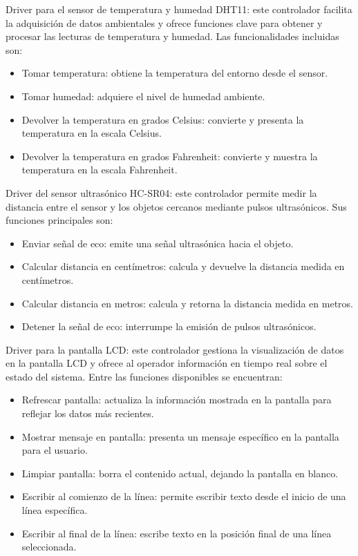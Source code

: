 Driver para el sensor de temperatura y humedad DHT11: este controlador facilita la adquisición de datos ambientales y ofrece funciones clave para obtener y procesar las lecturas de temperatura y humedad. Las funcionalidades incluidas son:
\begin{itemize}
\item Tomar temperatura: obtiene la temperatura del entorno desde el sensor.
\item Tomar humedad: adquiere el nivel de humedad ambiente.
\item Devolver la temperatura en grados Celsius: convierte y presenta la temperatura en la escala Celsius.
\item Devolver la temperatura en grados Fahrenheit: convierte y muestra la temperatura en la escala Fahrenheit.
\end{itemize}

Driver del sensor ultrasónico HC-SR04: este controlador permite medir la distancia entre el sensor y los objetos cercanos mediante pulsos ultrasónicos. Sus funciones principales son:
\begin{itemize}
\item Enviar señal de eco: emite una señal ultrasónica hacia el objeto.
\item Calcular distancia en centímetros: calcula y devuelve la distancia medida en centímetros.
\item Calcular distancia en metros: calcula y retorna la distancia medida en metros.
\item Detener la señal de eco: interrumpe la emisión de pulsos ultrasónicos.
\end{itemize}

Driver para la pantalla LCD: este controlador gestiona la visualización de datos en la pantalla LCD y ofrece al operador información en tiempo real sobre el estado del sistema. Entre las funciones disponibles se encuentran:
\begin{itemize}
\item Refrescar pantalla: actualiza la información mostrada en la pantalla para reflejar los datos más recientes.
\item Mostrar mensaje en pantalla: presenta un mensaje específico en la pantalla para el usuario.
\item Limpiar pantalla: borra el contenido actual, dejando la pantalla en blanco.
\item Escribir al comienzo de la línea: permite escribir texto desde el inicio de una línea específica.
\item Escribir al final de la línea: escribe texto en la posición final de una línea seleccionada.
\end{itemize}

